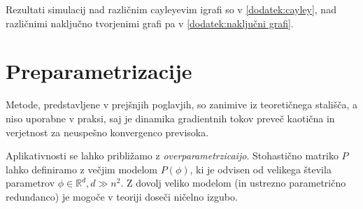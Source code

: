 \documentclass[mat2, tisk]{fmfdelo}
\newcommand{\R}{\mathbb R}
\begin{document}
            Rezultati simulacij nad različnim cayleyevim igrafi so v
            \ref{dodatek:cayley},
            nad različnimi naključno tvorjenimi grafi pa v
            \ref{dodatek:naključni grafi}.

            \clearpage
            \section{Preparametrizacije}
            \label{section:overparametrisation}
            Metode, predstavljene v prejšnjih poglavjih, so zanimive iz
            teoretičnega stališča, a niso uporabne v praksi,
            saj je dinamika gradientnih tokov preveč kaotična in
            verjetnost za neuspešno konvergenco previsoka.

            Aplikativnosti se lahko približamo z
            \emph{overparametrzicaijo}. Stohastično matriko $P$ lahko
            definiramo z večjim modelom $P(\phi)$, ki je odvisen od
            velikega števila parametrov $\phi \in \R^d, d \gg n^2$. Z
            dovolj veliko modelom (in ustrezno parametrično
            redundanco) je mogoče v teoriji doseči ničelno izgubo.
\end{document}
